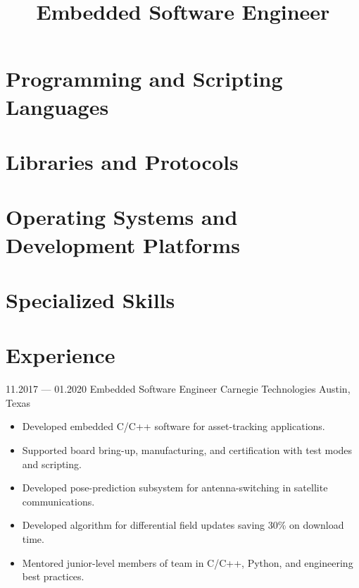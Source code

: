 \documentclass[11pt,a4paper,sans]{moderncv}
\title{Embedded Software Engineer}
\begin{document}
\makecvtitle

\section{Programming and Scripting Languages}

\section{Libraries and Protocols}

\section{Operating Systems and Development Platforms}

\section{Specialized Skills}

\section{Experience}

\cventry%
    {11.2017 --- 01.2020}%
    {Embedded Software Engineer}%
    {Carnegie Technologies}%
    {Austin, Texas}%
    {}%
    {%
    \begin{itemize}
        \item Developed embedded C/C++ software for asset-tracking applications.
        \item Supported board bring-up, manufacturing, and certification with test modes and scripting.
        \item Developed pose-prediction subsystem for antenna-switching in satellite communications.
        \item Developed algorithm for differential field updates saving 30\% on download time.
        \item Mentored junior-level members of team in C/C++, Python, and engineering best practices.
    \end{itemize}%
    }
\end{document}
